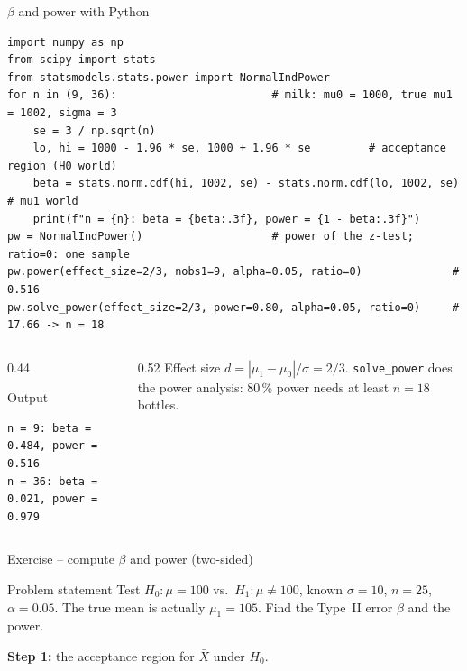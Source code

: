 \documentclass[aspectratio=169,11pt]{beamer}
\begin{document}
\begin{frame}[fragile]{$\beta$ and power with Python}
  \lstset{aboveskip=2pt,belowskip=2pt}
\begin{lstlisting}
import numpy as np
from scipy import stats
from statsmodels.stats.power import NormalIndPower
for n in (9, 36):                        # milk: mu0 = 1000, true mu1 = 1002, sigma = 3
    se = 3 / np.sqrt(n)
    lo, hi = 1000 - 1.96 * se, 1000 + 1.96 * se         # acceptance region (H0 world)
    beta = stats.norm.cdf(hi, 1002, se) - stats.norm.cdf(lo, 1002, se)  # mu1 world
    print(f"n = {n}: beta = {beta:.3f}, power = {1 - beta:.3f}")
pw = NormalIndPower()                    # power of the z-test; ratio=0: one sample
pw.power(effect_size=2/3, nobs1=9, alpha=0.05, ratio=0)              # 0.516
pw.solve_power(effect_size=2/3, power=0.80, alpha=0.05, ratio=0)     # 17.66 -> n = 18
\end{lstlisting}
  \begin{columns}[T]
    \begin{column}{0.44\textwidth}
      \begin{block}{Output}
\begin{lstlisting}[style=Pyout]
n = 9: beta = 0.484, power = 0.516
n = 36: beta = 0.021, power = 0.979
\end{lstlisting}
      \end{block}
    \end{column}
    \begin{column}{0.52\textwidth}
      \footnotesize Effect size $d=|\mu_1-\mu_0|/\sigma=2/3$.
      \texttt{solve\_power} does the power analysis: $80\,\%$ power needs
      at least $n=18$ bottles.
    \end{column}
  \end{columns}
\end{frame}
\begin{frame}{Exercise -- compute $\beta$ and power (two-sided)}
  \begin{block}{Problem statement}
    Test $H_0:\mu = 100$ vs.\ $H_1:\mu\neq 100$, known $\sigma = 10$, $n=25$,
    $\alpha=0.05$. The true mean is actually $\mu_1 = 105$. Find the Type~II
    error $\beta$ and the power.
  \end{block}
  \textbf{Step 1:} the acceptance region for $\bar X$ under $H_0$.
\end{frame}
\end{document}
